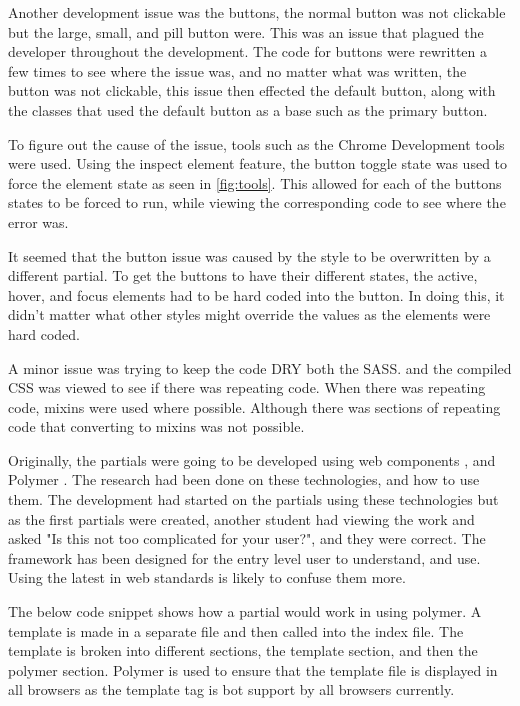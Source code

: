 Another development issue was the buttons, the normal button was not clickable but the large, small, and pill button were. This was an issue that plagued the developer throughout the development. The code for buttons were rewritten a few times to see where the issue was, and no matter what was written, the button was not clickable, this issue then effected the default button, along with the classes that used the default button as a base such as the primary button. 

To figure out the cause of the issue, tools such as the Chrome Development tools were used. Using the inspect element feature, the button toggle state was used to force the element state as seen in \ref{fig:tools}. This allowed for each of the buttons states to be forced to run, while viewing the corresponding code to see where the error was. 

It seemed that the button issue was caused by the style to be overwritten by a different partial. To get the buttons to have their different states, the active, hover, and focus elements had to be hard coded into the button. In doing this, it didn't matter what other styles might override the values as the elements were hard coded.

A minor issue was trying to keep the code DRY both the SASS. and the compiled CSS was viewed to see if there was repeating code. When there was repeating code, \gls{mixins} were used where possible. Although there was sections of repeating code that converting to \gls{mixins} was not possible. 

Originally, the partials were going to be developed using web components \citet{Web17}, and Polymer \citet{Google17b}. The research had been done on these technologies, and how to use them. The development had started on the partials using these technologies but as the first partials were created, another student had viewing the work and asked "Is this not too complicated for your user?", and they were correct. The framework has been designed for the entry level user to understand, and use. Using the latest in web standards is likely to confuse them more. 

The below code snippet shows how a partial would work in using polymer. A template is made in a separate file and then called into the index file. The template is broken into different sections, the template section, and then the polymer section. Polymer is used to ensure that the template file is displayed in all browsers as the template tag is bot support by all browsers currently. 

